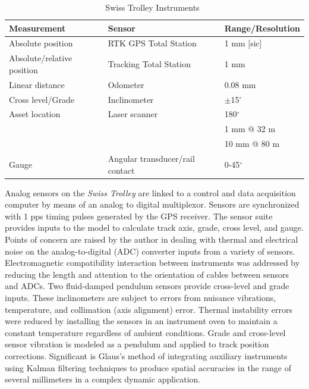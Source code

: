 \begin{table}[ht]
\begin{center}
	\caption{Swiss Trolley Instruments~\citep{2006glaus}}\label{tab:SwissTrolley}
	\begin{tabular}{ lll }
	\toprule
	Measurement & Sensor & Range/Resolution\\
	\midrule
	Absolute position & RTK GPS Total Station & 1 mm [sic]\\
	Absolute/relative position & Tracking Total Station & 1 mm\\
	Linear distance & Odometer & 0.08 mm\\
	Cross level/Grade & Inclinometer & $\pm$15$^{\circ}$\\
	Asset location & Laser scanner & 180$^{\circ}$\\
	& & 1 mm @ 32 m\\
	& & 10 mm @ 80 m\\
	Gauge & Angular transducer/rail contact & 0-45$^{\circ}$ \\
	\bottomrule
	\end{tabular}
\end{center}
\end{table}

Analog sensors on the \emph{Swiss Trolley} are linked to a control and data acquisition computer by means of an analog to digital multiplexor. Sensors are synchronized with 1 pps timing pulses generated by the GPS receiver. The sensor suite provides inputs to the model to calculate track axis, grade, cross level, and gauge. Points of concern are raised by the author in dealing with thermal and electrical noise on the analog-to-digital (ADC) converter inputs from a variety of sensors. Electromagnetic compatibility interaction between instruments was addressed by reducing the length and attention to the orientation of cables between sensors and ADCs. Two fluid-damped pendulum sensors provide cross-level and grade inputs. These inclinometers are subject to errors from nuisance vibrations, temperature, and collimation (axis alignment) error. Thermal instability errors were reduced by installing the sensors in an instrument oven to maintain a constant temperature regardless of ambient conditions. Grade and cross-level sensor vibration is modeled as a pendulum and applied to track position corrections. Significant is Glaus's method of integrating auxiliary instruments using Kalman filtering techniques to produce spatial accuracies in the range of several millimeters in a complex dynamic application.

